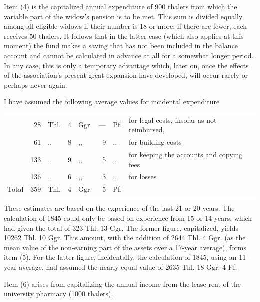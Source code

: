 Item (4) is the capitalized annual expenditure of 900 thalers from which the variable part of the widow's pension is to be met. This sum is divided equally among all eligible widows if their number is 18 or more; if there are fewer, each receives 50 thalers. It follows that in the latter case (which also applies at this moment) the fund makes a saving that has not been included in the balance account and cannot be calculated in advance at all for a somewhat longer period. In any case, this is only a temporary advantage which, later on, once the effects of the association's present great expansion have developed, will occur rarely or perhaps never again.

I have assumed the following average values for incidental expenditure
\begin{center}
\small\setlength{\tabcolsep}{2pt}
\begin{tabular}{r r l r l r l p{196pt}}
&28&Thl.&4&Ggr&—&Pf.&for legal costs, insofar as not reimbursed,\\
&61&,,&8&,,&9&,,&for building costs\\
&133&,,&9&,,&5&,,&for keeping the accounts and copying fees\\
&136&,,&6&,,&3&,,&for losses\\
Total&359&Thl.&4&Ggr.&5&Pf.&
\end{tabular}
\end{center}
\noindent\hspace*{\parindent}These estimates are based on the experience of the last 21 or 20 years. The calculation of 1845 could only be based on experience from 15 or 14 years, which had given the total of 323 Thl. 13 Ggr. The former figure, capitalized, yields 10262 Thl. 10 Ggr. This amount, with the addition of 2644 Thl. 4 Ggr. (as the mean value of the non-earning part of the assets over a 17-year average), forms item (5). For the latter figure, incidentally, the calculation of 1845, using an 11-year average, had assumed the nearly equal value of 2635 Thl. 18 Ggr. 4 Pf.

Item (6) arises from capitalizing the annual income from the lease rent of the university pharmacy (1000 thalers).
